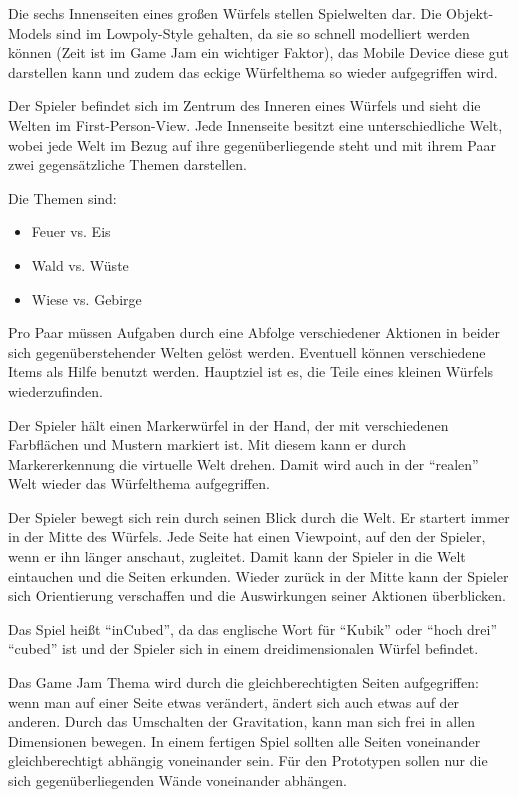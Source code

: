 
Die sechs Innenseiten eines großen Würfels stellen Spielwelten dar. Die Objekt-Models sind im Lowpoly-Style gehalten, da sie so schnell modelliert werden können (Zeit ist im Game Jam ein wichtiger Faktor), das Mobile Device diese gut darstellen kann und zudem das eckige Würfelthema so wieder aufgegriffen wird.

Der Spieler befindet sich im Zentrum des Inneren eines Würfels und sieht die Welten im First-Person-View. Jede Innenseite besitzt eine unterschiedliche Welt, wobei jede Welt im Bezug auf ihre gegenüberliegende steht und mit ihrem Paar zwei gegensätzliche Themen darstellen.    

Die Themen sind:
\begin{itemize}
\item Feuer vs. Eis
\item Wald vs. Wüste
\item Wiese vs. Gebirge
\end{itemize}

Pro Paar müssen Aufgaben durch eine Abfolge verschiedener Aktionen in beider sich gegenüberstehender Welten gelöst werden. Eventuell können verschiedene Items als Hilfe benutzt werden. Hauptziel ist es, die Teile eines kleinen Würfels wiederzufinden.

Der Spieler hält einen Markerwürfel in der Hand, der mit verschiedenen Farbflächen und Mustern markiert ist. Mit diesem kann er durch Markererkennung die virtuelle Welt drehen. Damit wird auch in der \enquote{realen} Welt wieder das Würfelthema aufgegriffen.

Der Spieler bewegt sich rein durch seinen Blick durch die Welt. Er startert immer in der Mitte des Würfels. Jede Seite hat einen Viewpoint, auf den der Spieler, wenn er ihn länger anschaut, zugleitet. Damit kann der Spieler in die Welt eintauchen und die Seiten erkunden. Wieder zurück in der Mitte kann der Spieler sich Orientierung verschaffen und die Auswirkungen seiner Aktionen überblicken.

Das Spiel heißt \enquote{inCubed}, da das englische Wort für \enquote{Kubik} oder \enquote{hoch drei} \enquote{cubed} ist und der Spieler sich in einem dreidimensionalen Würfel befindet.

Das Game Jam Thema wird durch die gleichberechtigten Seiten aufgegriffen: wenn man auf einer Seite etwas verändert, ändert sich auch etwas auf der anderen. Durch das Umschalten der Gravitation, kann man sich frei in allen Dimensionen bewegen. In einem fertigen Spiel sollten alle Seiten voneinander gleichberechtigt abhängig voneinander sein. Für den Prototypen sollen nur die sich gegenüberliegenden Wände voneinander abhängen.    